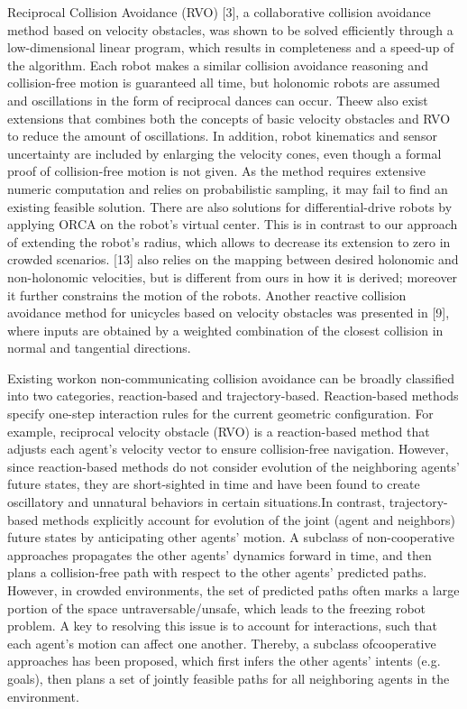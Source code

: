 \documentclass[12pt]{report}
\begin{document}
Reciprocal Collision Avoidance (RVO) [3], a collaborative collision avoidance
method based on velocity obstacles, was shown to be solved efficiently through a low-dimensional linear program, which results in completeness and a speed-up of the algorithm. Each robot makes a similar collision avoidance reasoning and collision-free motion is guaranteed all time, but holonomic robots are assumed and oscillations in the form of reciprocal dances can occur. Theew also exist extensions that combines both the concepts of basic velocity obstacles and RVO to reduce the amount of oscillations. In addition, robot kinematics and sensor uncertainty are included by enlarging the velocity cones, even though a formal proof of collision-free motion is not given.  As the method requires extensive numeric computation and relies on probabilistic sampling, it may fail to find an existing feasible solution. There are also solutions for differential-drive robots by applying ORCA on the robot’s virtual center. This is in contrast to our approach of extending the robot’s radius, which allows to decrease its extension to zero in crowded scenarios. [13] also relies on the mapping between desired holonomic and non-holonomic velocities, but is different from ours in how it is derived; moreover it further constrains the motion of the robots. Another reactive collision avoidance method for unicycles based on velocity obstacles was presented in [9], where inputs are obtained by a weighted combination of the closest collision in normal and tangential directions.

Existing  workon non-communicating collision avoidance can be broadly classified into two categories, reaction-based and trajectory-based.  Reaction-based  methods specify  one-step interaction rules for the current geometric configuration. For example, reciprocal velocity obstacle (RVO) is a reaction-based method that adjusts each  agent’s velocity vector to ensure collision-free navigation. However, since reaction-based methods do not consider evolution of the neighboring agents’ future states, they are short-sighted in time and have been found to create oscillatory and unnatural behaviors in certain situations.In contrast, trajectory-based methods  explicitly account for evolution of the joint (agent and neighbors) future states by  anticipating other agents’ motion. A subclass of non-cooperative approaches propagates the other agents’ dynamics forward in time, and then plans a collision-free path with respect to the other agents’ predicted paths. However, in crowded environments,  the set of predicted paths often marks a large portion of the space untraversable/unsafe, which leads to the freezing robot problem. A key to resolving this issue is to  account for interactions, such that each agent’s motion can affect one another. Thereby, a subclass ofcooperative approaches has been proposed, which first infers the other agents’ intents (e.g. goals), then plans a set of jointly feasible paths for all  neighboring agents in the environment.
\end{document}
